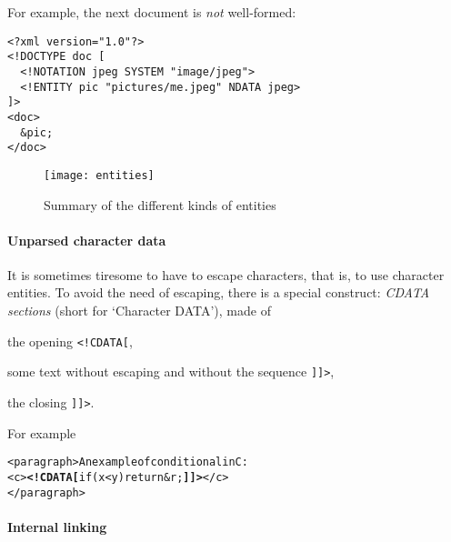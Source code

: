 For example, the next document is \emph{not} well\hyp{}formed:
\begin{verbatim}
<?xml version="1.0"?>
<!DOCTYPE doc [
  <!NOTATION jpeg SYSTEM "image/jpeg">
  <!ENTITY pic "pictures/me.jpeg" NDATA jpeg>
]>
<doc>
  &pic;
</doc>
\end{verbatim}
\begin{figure}[b]
\centering
\texttt{[image: entities]}
\caption{Summary of the different kinds of entities}
\end{figure}

\paragraph{Unparsed character data}

It is sometimes tiresome to have to escape characters, that is, to use
character entities. To avoid the need of escaping, there is a special
construct: \emph{CDATA sections} (short for `Character DATA'), made of
\begin{enumerate*}

  \item the opening \verb|<!CDATA[|,

  \item some text without escaping and without the sequence
    \verb|]]>|,

  \item the closing \verb|]]>|.

\end{enumerate*}
For example
\begin{alltt}
<paragraph>An example of conditional in C:
  <c>\textbf{<!CDATA[}if (x < y) return &r;\textbf{]]>}</c>
</paragraph>
\end{alltt}

\paragraph{Internal linking}

